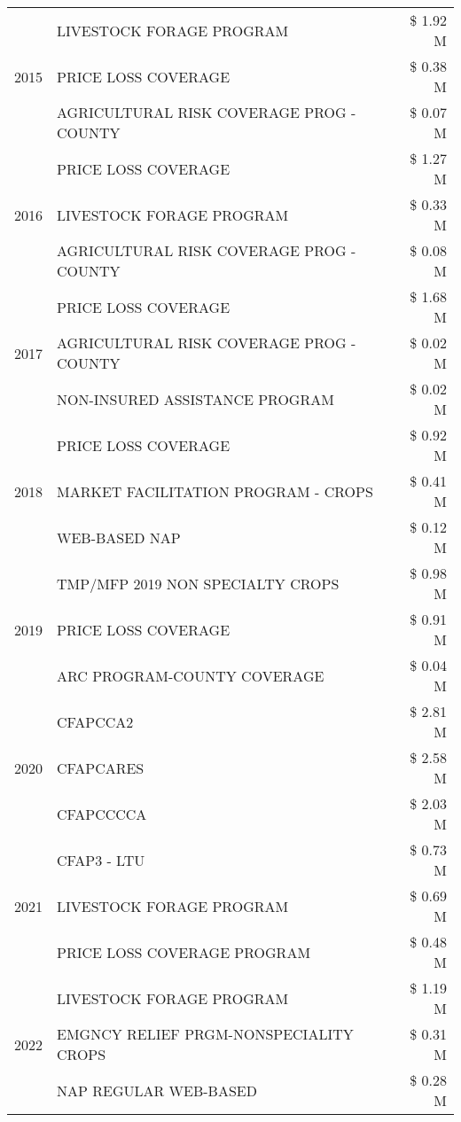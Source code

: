 \begin{tabular}{llr}
\multirow[t]{3}{*}{2015} & LIVESTOCK FORAGE PROGRAM & \$ 1.92 M \\
 & PRICE LOSS COVERAGE & \$ 0.38 M \\
 & AGRICULTURAL RISK COVERAGE PROG - COUNTY & \$ 0.07 M \\
\cline{1-3}
\multirow[t]{3}{*}{2016} & PRICE LOSS COVERAGE & \$ 1.27 M \\
 & LIVESTOCK FORAGE PROGRAM & \$ 0.33 M \\
 & AGRICULTURAL RISK COVERAGE PROG - COUNTY & \$ 0.08 M \\
\cline{1-3}
\multirow[t]{3}{*}{2017} & PRICE LOSS COVERAGE & \$ 1.68 M \\
 & AGRICULTURAL RISK COVERAGE PROG - COUNTY & \$ 0.02 M \\
 & NON-INSURED ASSISTANCE PROGRAM & \$ 0.02 M \\
\cline{1-3}
\multirow[t]{3}{*}{2018} & PRICE LOSS COVERAGE & \$ 0.92 M \\
 & MARKET FACILITATION PROGRAM - CROPS & \$ 0.41 M \\
 & WEB-BASED NAP & \$ 0.12 M \\
\cline{1-3}
\multirow[t]{3}{*}{2019} & TMP/MFP 2019 NON SPECIALTY CROPS & \$ 0.98 M \\
 & PRICE LOSS COVERAGE & \$ 0.91 M \\
 & ARC PROGRAM-COUNTY COVERAGE & \$ 0.04 M \\
\cline{1-3}
\multirow[t]{3}{*}{2020} & CFAPCCA2 & \$ 2.81 M \\
 & CFAPCARES & \$ 2.58 M \\
 & CFAPCCCCA & \$ 2.03 M \\
\cline{1-3}
\multirow[t]{3}{*}{2021} & CFAP3 - LTU & \$ 0.73 M \\
 & LIVESTOCK FORAGE PROGRAM & \$ 0.69 M \\
 & PRICE LOSS COVERAGE PROGRAM & \$ 0.48 M \\
\cline{1-3}
\multirow[t]{3}{*}{2022} & LIVESTOCK FORAGE PROGRAM & \$ 1.19 M \\
 & EMGNCY RELIEF PRGM-NONSPECIALITY CROPS & \$ 0.31 M \\
 & NAP REGULAR WEB-BASED & \$ 0.28 M \\
\cline{1-3}
\bottomrule
\end{tabular}
